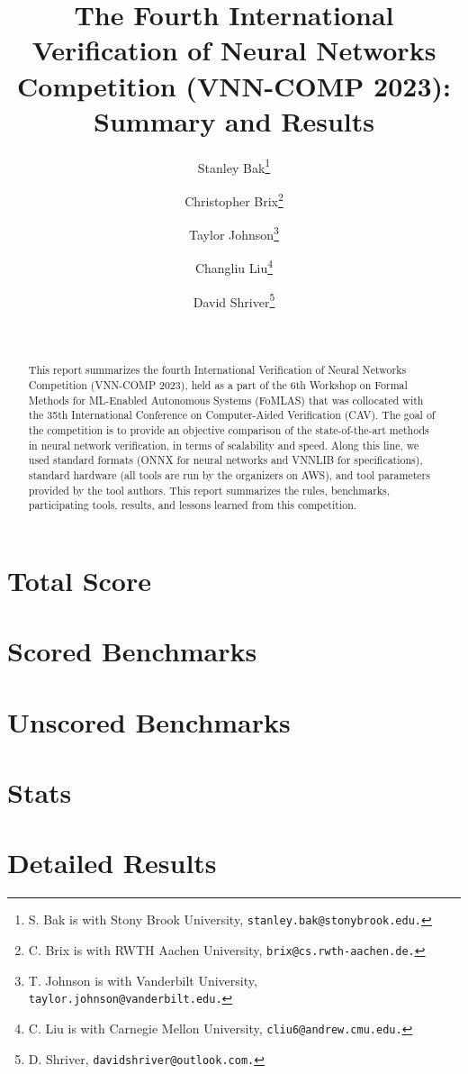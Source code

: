 \documentclass{easychair}
\title{The Fourth International Verification of Neural Networks Competition (VNN-COMP 2023): Summary and Results%
}
\author{
    Stanley Bak\thanks{S. Bak is with Stony Brook University, \tt stanley.bak@stonybrook.edu.} \and
    Christopher Brix\thanks{C. Brix is with RWTH Aachen University, \tt brix@cs.rwth-aachen.de.} \and
    Taylor Johnson\thanks{T. Johnson is with Vanderbilt University, \tt taylor.johnson@vanderbilt.edu.} \and
    Changliu Liu\thanks{C. Liu is with Carnegie Mellon University, \tt cliu6@andrew.cmu.edu.} \and
    David Shriver\thanks{D. Shriver, \tt davidshriver@outlook.com.}
}
\institute{
 }
\date{\phantom{date}\\}
\begin{document}
\maketitle

\begin{abstract}
This report summarizes the fourth International Verification of Neural Networks Competition (VNN-COMP 2023), held as a part of the 6th Workshop on Formal Methods for ML-Enabled Autonomous Systems (FoMLAS) that was collocated with the 35th International Conference on Computer-Aided Verification (CAV).
%
%
The goal of the competition is to provide an objective comparison of the state-of-the-art methods in neural network verification, in terms of scalability and speed.
%
Along this line, we used standard formats (ONNX for neural networks and VNNLIB for specifications), standard hardware (all tools are run by the organizers on AWS), and tool parameters provided by the tool authors.
%
This report summarizes the rules, benchmarks, participating tools, results, and lessons learned from this competition.
\end{abstract}



%
\section{Total Score}




\clearpage
\section{Scored Benchmarks}


\clearpage
\section{Unscored Benchmarks}


\clearpage
\section{Stats}


\clearpage
\section{Detailed Results}

\end{document}
